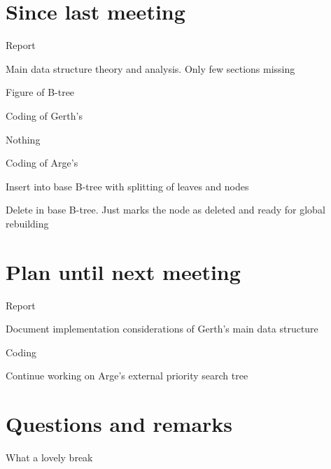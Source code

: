 \documentclass[a4paper,11pt,agenda,chair]{meetingmins}
\begin{document}
\maketitle

\section{Since last meeting}
\begin{items}
\item Report
	\begin{items}
		\item Main data structure theory and analysis. Only few sections missing
		\item Figure of B-tree
	\end{items}
\item Coding of Gerth's
	\begin{items}
		\item Nothing
	\end{items}
\item Coding of Arge's
	\begin{items}
		\item Insert into base B-tree with splitting of leaves and nodes
		\item Delete in base B-tree. Just marks the node as deleted and ready for global rebuilding
	\end{items}
\end{items}

\section{Plan until next meeting}
\begin{items}
\item Report
	\begin{items}
		\item Document implementation considerations of Gerth's main data structure
	\end{items}
\item Coding
	\begin{items}
		\item Continue working on Arge's external priority search tree
	\end{items}
\end{items}

\section{Questions and remarks}
\begin{items}
	\item What a lovely break
\end{items}
\end{document}

